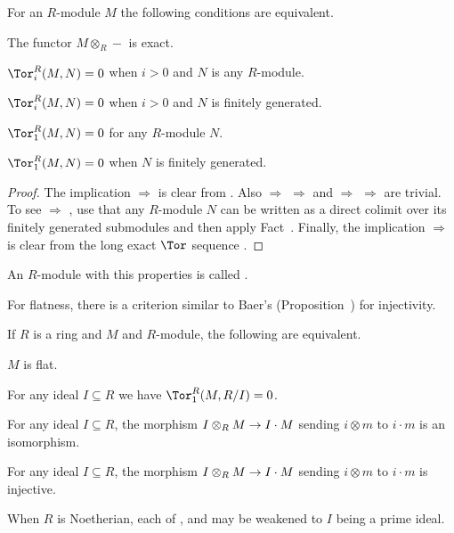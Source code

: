 \documentclass[a4paper,parskip=half,numbers=enddot, DIV=12]{scrreprt}
\begin{document}
\begin{prop}
	For an $R$-module $M$ the following conditions are equivalent.
	\begin{alphanumerate}
		\item The functor $M\otimes _R-$ is exact.
		\item $\Tor_i^R(M,N)=0$ when $i>0$ and $N$ is any $R$-module.
		\item $\Tor_i^R(M,N)=0$ when $i>0$ and $N$ is finitely generated.
		\item $\Tor_1^R(M,N)=0$ for any $R$-module $N$.
		\item $\Tor_1^R(M,N)=0$ when $N$ is finitely generated.
	\end{alphanumerate}
\end{prop}
\begin{proof}
	The implication  $\Rightarrow$  is clear from . Also  $\Rightarrow$  $\Rightarrow$  and  $\Rightarrow$  $\Rightarrow$  are trivial. To see  $\Rightarrow$ , use that any $R$-module $N$ can be written as a direct colimit over its finitely generated submodules and then apply Fact~. Finally, the implication  $\Rightarrow$  is clear from the long exact $\Tor$ sequence . 
\end{proof}
\begin{defi}
	An $R$-module with this properties is called .
\end{defi}
For flatness, there is a criterion similar to Baer's (Proposition~) for injectivity.
\begin{prop}
	If $R$ is a ring and $M$ and $R$-module, the following are equivalent.
	\begin{alphanumerate}
		\item $M$ is flat.
		\item For any ideal $I\subseteq R$ we have $\Tor_1^R(M,R/I)=0$.
		\item For any ideal $I\subseteq R$, the morphism $I\otimes_RM\morphism I\cdot M$ sending $i\otimes m$ to $i\cdot m$ is an isomorphism.
		\item For any ideal $I\subseteq R$, the morphism $I\otimes_RM\morphism I\cdot M$ sending $i\otimes m$ to $i\cdot m$ is injective.
	\end{alphanumerate}
	When $R$ is Noetherian, each of ,  and  may be weakened to $I$ being a prime ideal.
\end{prop}
\end{document}
